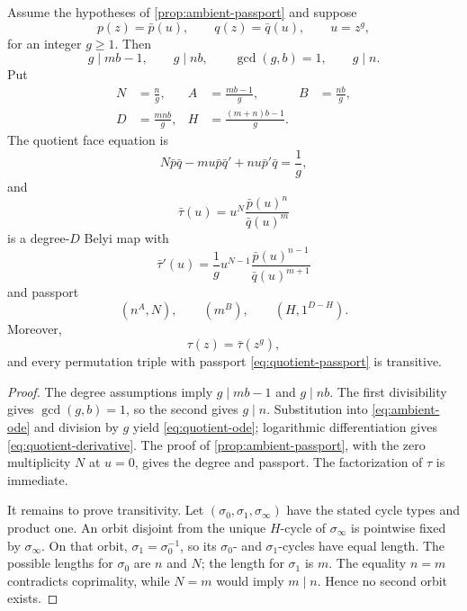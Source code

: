 \documentclass[11pt,reqno]{amsart}
\begin{document}
\begin{theorem}
\label{thm:lattice-gap}
Assume the hypotheses of \cref{prop:ambient-passport} and suppose
\[
p(z)=\bar p(u),\qquad q(z)=\bar q(u),\qquad u=z^g,
\]
for an integer \(g\ge1\).  Then
\[
g\mid mb-1,\qquad g\mid nb,\qquad \gcd(g,b)=1,\qquad g\mid n.
\]
Put
\begin{align*}
N&=\frac ng,&
A&=\frac{mb-1}{g},&
B&=\frac{nb}{g},\\
D&=\frac{mnb}{g},&
H&=\frac{(m+n)b-1}{g}.&&
\end{align*}
The quotient face equation is
\begin{equation}
\label{eq:quotient-ode}
N\bar p\bar q-mu\bar p\bar q'
+nu\bar p'\bar q=\frac1g,
\end{equation}
and
\begin{equation}
\label{eq:quotient-map}
\bar\tau(u)=u^N\frac{\bar p(u)^n}{\bar q(u)^m}
\end{equation}
is a degree-\(D\) Belyi map with
\begin{equation}
\label{eq:quotient-derivative}
\bar\tau'(u)=\frac1g
u^{N-1}\frac{\bar p(u)^{n-1}}{\bar q(u)^{m+1}}
\end{equation}
and passport
\begin{equation}
\label{eq:quotient-passport}
\left(n^A,N\right),\qquad
\left(m^B\right),\qquad
\left(H,1^{D-H}\right).
\end{equation}
Moreover,
\[
\tau(z)=\bar\tau(z^g),
\]
and every permutation triple with passport
\eqref{eq:quotient-passport} is transitive.
\end{theorem}

\begin{proof}
The degree assumptions imply \(g\mid mb-1\) and \(g\mid nb\).
The first divisibility gives \(\gcd(g,b)=1\), so the second gives \(g\mid n\).
Substitution into \eqref{eq:ambient-ode} and division by \(g\) yield
\eqref{eq:quotient-ode}; logarithmic differentiation gives
\eqref{eq:quotient-derivative}.  The proof of
\cref{prop:ambient-passport}, with the zero multiplicity \(N\) at \(u=0\),
gives the degree and passport.  The factorization of \(\tau\) is immediate.

It remains to prove transitivity.  Let
\((\sigma_0,\sigma_1,\sigma_\infty)\) have the stated cycle types and
product one.  An orbit disjoint from the unique \(H\)-cycle of
\(\sigma_\infty\) is pointwise fixed by \(\sigma_\infty\).  On that orbit,
\(\sigma_1=\sigma_0^{-1}\), so its \(\sigma_0\)- and
\(\sigma_1\)-cycles have equal length.  The possible lengths for
\(\sigma_0\) are \(n\) and \(N\); the length for \(\sigma_1\) is \(m\).
The equality \(n=m\) contradicts coprimality, while \(N=m\) would imply
\(m\mid n\).  Hence no second orbit exists.
\end{proof}
\end{document}
